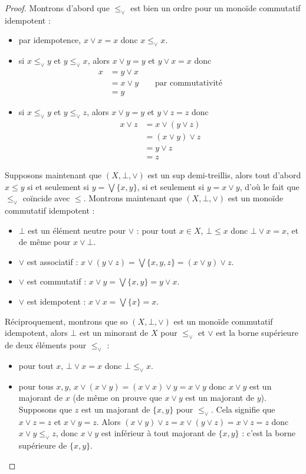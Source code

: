\begin{proof}
  Montrons d'abord que $\leq_\lor$ est bien un ordre pour un monoïde commutatif
  idempotent :
  \begin{itemize}
  \item par idempotence, $x\lor x = x$ donc $x\leq_\lor x$.
  \item si $x\leq_\lor y$ et $y\leq_\lor x$, alors $x\lor y = y$ et $y \lor x = x$
    donc
    \begin{align*}
      x &= y \lor x \\
      &= x \lor y \qquad\text{par commutativité}\\
      &= y
    \end{align*}
  \item si $x\leq_\lor y$ et $y\leq_\lor z$, alors $x\lor y = y$ et $y \lor z = z$
    donc
    \begin{align*}
      x\lor z &= x \lor (y \lor z) \\
      &= (x \lor y) \lor z \\
      &= y \lor z \\
      &= z
    \end{align*}
  \end{itemize}

  Supposons maintenant que $(X,\bot,\lor)$ est un sup demi-treillis, alors tout
  d'abord $x\leq y$ si et seulement si $y = \bigvee\{x,y\}$, si et seulement si
  $y = x \lor y$, d'où le fait que $\leq_\lor$ coïncide avec $\leq$. Montrons
  maintenant que $(X,\bot,\lor)$ est un monoïde commutatif idempotent :
  \begin{itemize}
  \item $\bot$ est un élément neutre pour $\lor$ : pour tout $x\in X$,
    $\bot\leq x$ donc $\bot \vee x = x$, et de même pour $x\vee\bot$.
  \item $\lor$ est associatif :
    $x\lor (y \lor z) = \bigvee\{x,y,z\} = (x\lor y)\lor z$.
  \item $\lor$ est commutatif : $x\lor y = \bigvee\{x,y\}=y\lor x$.
  \item $\lor$ est idempotent : $x\lor x = \bigvee\{x\}=x$.
  \end{itemize}

  Réciproquement, montrons que so $(X,\bot,\lor)$ est un monoïde commutatif
  idempotent, alors $\bot$ est un minorant de $X$ pour $\leq_\lor$ et $\lor$ est
  la borne supérieure de deux éléments pour $\leq_\lor$ :
  \begin{itemize}
  \item pour tout $x$, $\bot \lor x = x$ donc $\bot \leq_\lor x$.
  \item pour tous $x,y$, $x\lor (x\lor y) = (x\lor x)\lor y = x\lor y$ donc
    $x\lor y$ est un majorant de $x$ (de même on prouve que $x\lor y$ est un
    majorant de $y$). Supposons que $z$ est un majorant de $\{x,y\}$ pour
    $\leq_\lor$. Cela signifie que $x\lor z = z$ et $x\lor y = z$. Alors
    $(x\lor y)\lor z = x\lor (y\lor z) = x\lor z = z$ donc
    $x\lor y \leq_\lor z$, donc $x\lor y$ est inférieur à tout majorant de
    $\{x,y\}$ : c'est la borne supérieure de $\{x,y\}$.
  \end{itemize}
\end{proof}

